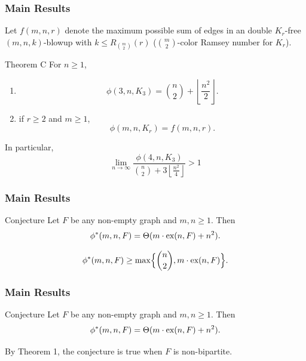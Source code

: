 \documentclass{beamer}
\newcommand*{\ex}{\textnormal{ex}}
\begin{document}
\begin{frame}

  \frametitle{Main Results}

  Let $f(m, n, r)$ denote the maximum possible sum of edges in an double $K_r$-free $(m, n, k)$-blowup with $k \leq R_{\binom{m}{2}}(r)$ ($\binom{m}{2}$-color Ramsey number for $K_r$).

  \pause

  \begin{block}{Theorem C}
    For $n \geq 1$,
    \begin{enumerate}
      \item 
      \[
        \phi(3, n, K_3) = \binom{n}{2} + \left\lfloor \frac{n^2}{2} \right\rfloor.
      \]
      \item if $r \geq 2$ and $m \geq 1$,
      \[
        \phi(m, n, K_r) = f(m, n, r).
      \]
    \end{enumerate}
    In particular,
    \[
      \lim_{n \to \infty} \frac{\phi(4, n, K_3)}{\binom{n}{2} + 3\left\lfloor \frac{n^2}{4} \right\rfloor} > 1
    \]
  \end{block}
\end{frame}

\begin{frame}
  \frametitle{Main Results}

  \begin{block}{Conjecture}
    Let $F$ be any non-empty graph and $m, n \geq 1$. Then
    \[ 
      \phi^*(m,n,F) = \Theta(m \cdot \ex(n,F) + n^2).
    \]
  \end{block}

  \pause

  \vspace{0.3cm}

  \[ 
    \phi^*(m,n,F) \geq \max\Bigl\{\binom{n}{2},m\cdot \ex(n,F)\Bigr\}.
  \]
\end{frame}

\begin{frame}
  \frametitle{Main Results}

  \begin{block}{Conjecture}
    Let $F$ be any non-empty graph and $m, n \geq 1$. Then
    \[ 
      \phi^*(m,n,F) = \Theta(m \cdot \ex(n,F) + n^2).
    \]
  \end{block}

  \vspace{0.5cm}

  By Theorem 1, the conjecture is true when $F$ is non-bipartite.
\end{frame}
\end{document}
